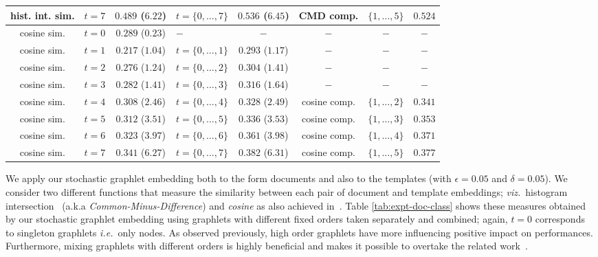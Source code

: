 \documentclass[journal]{IEEEtran}
\theoremstyle{definition}
\newcommand{\ie}{\textit{i.e.}}
\newcommand{\viz}{\textit{viz.}}
\newcommand{\tab}[1]{Table \ref{#1}}
\begin{document}
\begin{table}[!htbp]
\begin{center}
{\begin{tabular}{|c|l|c||l|c||c|c|c|}
hist. int. sim. & $t=7$ & $0.489$ ($6.22$) & $t=\lbrace 0,\dots, 7 \rbrace$ & $\mathbf{0.536}$ ($6.45$) & CMD comp. & $\lbrace 1, \dots, 5 \rbrace$ & $0.524$\\
\hline
cosine sim. & $t=0$ & $0.289$ ($0.23$) & $-$ & $-$ & $-$ & $-$ & $-$\\
cosine sim. & $t=1$ & $0.217$ ($1.04$) & $t=\lbrace 0,\dots, 1 \rbrace$ & $0.293$ ($1.17$) & $-$ & $-$ & $-$\\
cosine sim. & $t=2$ & $0.276$ ($1.24$) & $t=\lbrace 0,\dots, 2 \rbrace$ & $0.304$ ($1.41$) & $-$ & $-$ & $-$\\
cosine sim. & $t=3$ & $0.282$ ($1.41$) & $t=\lbrace 0,\dots, 3 \rbrace$ & $0.316$ ($1.64$) & $-$ & $-$ & $-$\\
cosine sim. & $t=4$ & $0.308$ ($2.46$) & $t=\lbrace 0,\dots, 4 \rbrace$ & $0.328$ ($2.49$) & cosine comp. & $\lbrace 1, \dots, 2 \rbrace$ & $0.341$\\
cosine sim. & $t=5$ & $0.312$ ($3.51$) & $t=\lbrace 0,\dots, 5 \rbrace$ & $0.336$ ($3.53$) & cosine comp. & $\lbrace 1, \dots, 3 \rbrace$ & $0.353$\\
cosine sim. & $t=6$ & $0.323$ ($3.97$) & $t=\lbrace 0,\dots, 6 \rbrace$ & $0.361$ ($3.98$) & cosine comp. & $\lbrace 1, \dots, 4 \rbrace$ & $0.371$\\
cosine sim. & $t=7$ & $0.341$ ($6.27$) & $t=\lbrace 0,\dots, 7 \rbrace$ & $\mathbf{0.382}$ ($6.31$) & cosine comp. & $\lbrace 1, \dots, 5 \rbrace$ & $0.377$\\
\hline
\end{tabular}}
\end{center}
\end{table}

We apply our stochastic graphlet embedding both to the form documents and also to the templates (with $\epsilon=0.05$ and $\delta=0.05$). We consider two different functions that measure the similarity between each pair of document and template embeddings; \viz~histogram intersection{~\cite{Barla2003}} (a.k.a \emph{Common-Minus-Difference}) and \emph{cosine} as also achieved in~\cite{Saund2013}. \tab{tab:expt-doc-class} shows these measures obtained by our stochastic graphlet embedding using graphlets with different fixed orders taken separately and combined; again, $t=0$ corresponds to singleton graphlets \ie~only nodes. As observed previously, high order graphlets have more influencing positive impact on performances. Furthermore, mixing graphlets with different orders is highly beneficial and makes it possible to overtake the related work~\cite{Saund2013}.
\end{document}
